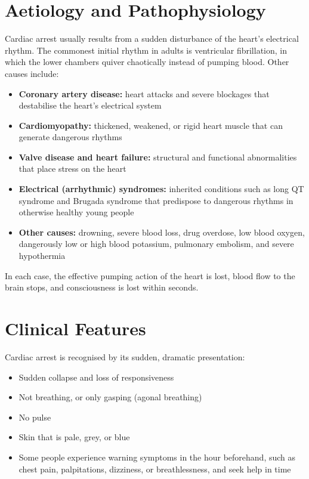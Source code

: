 \section*{Aetiology and Pathophysiology}
Cardiac arrest usually results from a sudden disturbance of the heart's electrical rhythm. The commonest initial rhythm in adults is ventricular fibrillation, in which the lower chambers quiver chaotically instead of pumping blood. Other causes include:
\begin{itemize}
    \item \textbf{Coronary artery disease:} heart attacks and severe blockages that destabilise the heart's electrical system
    \item \textbf{Cardiomyopathy:} thickened, weakened, or rigid heart muscle that can generate dangerous rhythms
    \item \textbf{Valve disease and heart failure:} structural and functional abnormalities that place stress on the heart
    \item \textbf{Electrical (arrhythmic) syndromes:} inherited conditions such as long QT syndrome and Brugada syndrome that predispose to dangerous rhythms in otherwise healthy young people
    \item \textbf{Other causes:} drowning, severe blood loss, drug overdose, low blood oxygen, dangerously low or high blood potassium, pulmonary embolism, and severe hypothermia
\end{itemize}
In each case, the effective pumping action of the heart is lost, blood flow to the brain stops, and consciousness is lost within seconds.

\section*{Clinical Features}
Cardiac arrest is recognised by its sudden, dramatic presentation:
\begin{itemize}
    \item Sudden collapse and loss of responsiveness
    \item Not breathing, or only gasping (agonal breathing)
    \item No pulse
    \item Skin that is pale, grey, or blue
    \item Some people experience warning symptoms in the hour beforehand, such as chest pain, palpitations, dizziness, or breathlessness, and seek help in time
\end{itemize}


